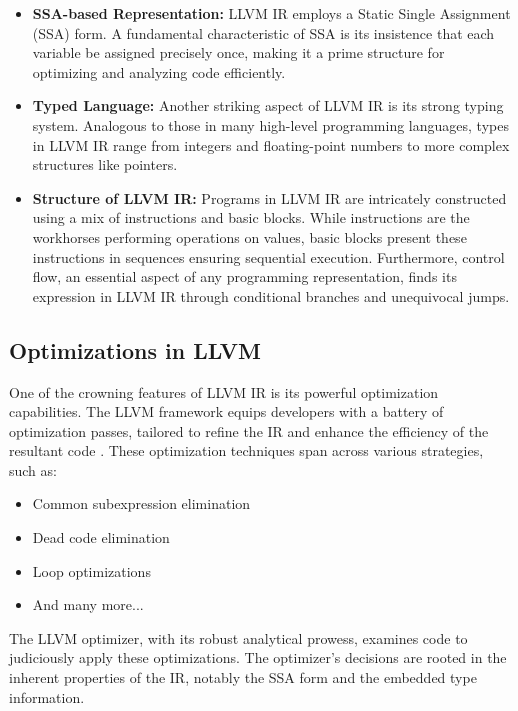 \documentclass[
  oneside,
  english,
  coorientadorbanca,
  noabntexcite
]{ufsc-thesis-rn46-2019}
\begin{document}
\begin{itemize}
    \item \textbf{SSA-based Representation:} LLVM IR employs a Static Single Assignment (SSA) form. A fundamental characteristic of SSA is its insistence that each variable be assigned precisely once, making it a prime structure for optimizing and analyzing code efficiently.
    
    \item \textbf{Typed Language:} Another striking aspect of LLVM IR is its strong typing system. Analogous to those in many high-level programming languages, types in LLVM IR range from integers and floating-point numbers to more complex structures like pointers.
    
    \item \textbf{Structure of LLVM IR:} Programs in LLVM IR are intricately constructed using a mix of instructions and basic blocks. While instructions are the workhorses performing operations on values, basic blocks present these instructions in sequences ensuring sequential execution. Furthermore, control flow, an essential aspect of any programming representation, finds its expression in LLVM IR through conditional branches and unequivocal jumps.
\end{itemize}

\subsection{Optimizations in LLVM}

One of the crowning features of LLVM IR is its powerful optimization capabilities. The LLVM framework equips developers with a battery of optimization passes, tailored to refine the IR and enhance the efficiency of the resultant code \cite{lee2018reconciling}. These optimization techniques span across various strategies, such as:

\begin{itemize}
    \item Common subexpression elimination
    \item Dead code elimination
    \item Loop optimizations
    \item And many more...
\end{itemize}

The LLVM optimizer, with its robust analytical prowess, examines code to judiciously apply these optimizations. The optimizer's decisions are rooted in the inherent properties of the IR, notably the SSA form and the embedded type information.
\end{document}
